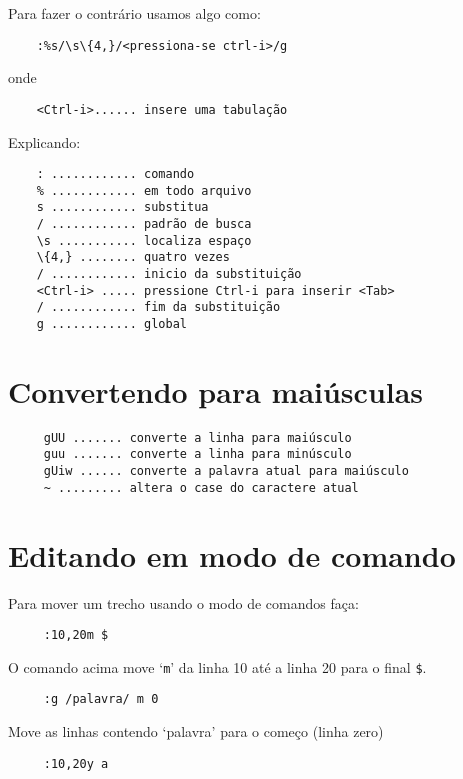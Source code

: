 Para fazer o contrário usamos algo como:

\begin{verbatim}
    :%s/\s\{4,}/<pressiona-se ctrl-i>/g
\end{verbatim}
onde
\begin{verbatim}
    <Ctrl-i>...... insere uma tabulação
\end{verbatim}

Explicando:
\begin{verbatim}
    : ............ comando
    % ............ em todo arquivo 
    s ............ substitua 
    / ............ padrão de busca
    \s ........... localiza espaço
    \{4,} ........ quatro vezes
    / ............ inicio da substituição
    <Ctrl-i> ..... pressione Ctrl-i para inserir <Tab>
    / ............ fim da substituição
    g ............ global
\end{verbatim}

\section{Convertendo para maiúsculas}
\label{sec:Convertendo para maiúsculas}

\begin{verbatim}
     gUU ....... converte a linha para maiúsculo
     guu ....... converte a linha para minúsculo
     gUiw ...... converte a palavra atual para maiúsculo
     ~ ......... altera o case do caractere atual
\end{verbatim}

\section{Editando em modo de comando}
\label{sec:Editando em modo de comando}

Para mover um trecho usando o modo de comandos faça:

\begin{verbatim}
     :10,20m $
\end{verbatim}

O comando acima move `{\tt m}' da linha 10 até a linha 20 para o final \verb|$|.

\begin{verbatim}
     :g /palavra/ m 0
\end{verbatim}

Move as linhas contendo `palavra' para o começo (linha zero)


\begin{verbatim}
     :10,20y a
\end{verbatim}


